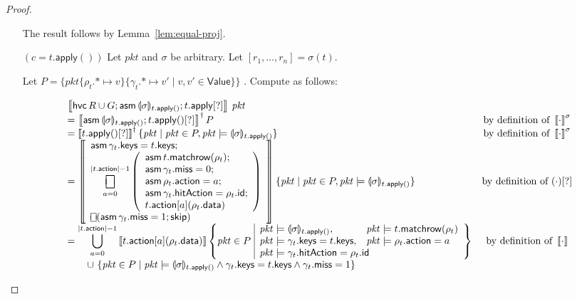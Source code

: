 \documentclass{article}
\newcommand{\pkt}{\mathit{pkt}}
\newcommand{\denote}[1]{\left\llbracket#1\right\rrbracket}
\newcommand{\Value}{\mathsf{Value}}
\newcommand{\action}{\mathsf{action}}
\newcommand{\keys}{\mathsf{keys}}
\newcommand{\data}{\mathsf{data}}
\newcommand{\id}{\mathsf{id}}
\newcommand{\hitAction}{\mathsf{hitAction}}
\newcommand{\miss}{\mathsf{miss}}
\newcommand{\assume}{\mathop{\mathsf{asm}}}
\newcommand{\apply}{\mathsf{apply}}
\newcommand{\choiceop}{\rotatebox[origin=c]{90}{$\sqsubset\!\!\!\sqsupset$}}
\newcommand{\choice}{\mathbin{\choiceop}}
\DeclareMathOperator*{\bigchoice}{\scalerel*{\choiceop}{\sum}}
\newcommand{\havoc}[1]{\mathop{\mathsf{hvc}}#1}
\newcommand{\SKIP}{\mathsf{skip}}
\newcommand{\state}[1]{\llparenthesis#1\rrparenthesis}
\newcommand{\instr}{[?]}
\newcommand{\matchrow}{\mathsf{matchrow}}
\begin{document}
\begin{proof}
\begin{enumerate}[align=left]
    The result follows by Lemma~\ref{lem:equal-proj}.

  \item[$(c = t.\apply())$] Let $\pkt$ and $\sigma$ be arbitrary. Let
    $[r_1,\ldots, r_n] = \sigma(t)$.

    Let $P = \{\pkt\{\rho_t.* \mapsto
      v\}\{\gamma_t.* \mapsto v' \mid v,v' \in \Value\} \}$ .
      Compute as follows:

      \[\begin{array}{lcl}
      \denote{\havoc R \cup G; \assume {\state\sigma_{t.\apply()}}; t.\apply\instr}\,\pkt
      & \\
      = \denote{\assume {\state\sigma_{t.\apply()}}; t.\apply()\instr}^\dagger P
      & \text{by definition of }\denote{\cdot}^\sigma \\
      = \denote{t.\apply()\instr}^\dagger \{\pkt \mid \pkt \in P, \pkt \models \state\sigma_{t.\apply()} \}
      & \text{by definition of }\denote{\cdot}^\sigma \\
      = \denote{  \begin{array}{l} \displaystyle
          \assume \gamma_t.\keys = t.\keys; \\
          \displaystyle \bigchoice_{a=0}^{|t.\action| -1}
          \left(\begin{array}{l}
            \assume t.\matchrow(\rho_t); \\
            \assume \gamma_t.\miss = 0;\\
            \assume \rho_t.\action = a;\\
            \assume \gamma_t.\hitAction = \rho_t.\id;\\
            t.\action[a](\rho_t.\data)
          \end{array}\right) \\
          \choice (\assume \gamma_t.\miss = 1;\SKIP) \\
      \end{array}}
      \{\pkt \mid \pkt \in P, \pkt \models \state\sigma_{t.\apply()} \}
      & \text{by definition of }(\cdot)\instr \\
      = \displaystyle\bigcup_{a=0}^{|t.\action| - 1}
      \denote{t.\action[a](\rho_t.\data)}
      \left\{\pkt \in P\,\, \begin{array}{|ll}
        \pkt \models \state\sigma_{t.\apply()}, & \pkt \models t.\matchrow(\rho_t)\\
        \pkt \models \gamma_t.\keys = t.\keys, & \pkt \models \rho_t.\action = a \\
        \multicolumn{2}{|l}{\pkt \models \gamma_t.\hitAction = \rho_t.\id}
      \end{array}\right\}
      & \text{by definition of }\denote{\cdot}\\
      \qquad \cup\,\,\{\pkt \in P \mid \pkt \models \state\sigma_{t.\apply()} \wedge \gamma_t.\keys = t.\keys \wedge \gamma_t.\miss = 1 \}
      \end{array}\]


\end{enumerate}
\end{proof}
\end{document}

